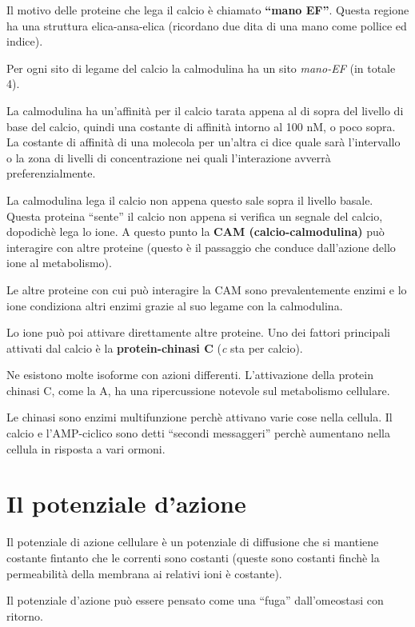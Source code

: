 \documentclass[]{article}
\begin{document}
Il motivo delle proteine che lega il calcio è chiamato \textbf{``mano
EF''}. Questa regione ha una struttura elica-ansa-elica (ricordano due
dita di una mano come pollice ed indice).

Per ogni sito di legame del calcio la calmodulina ha un sito
\emph{mano-EF} (in totale 4).

La calmodulina ha un'affinità per il calcio tarata appena al di sopra
del livello di base del calcio, quindi una costante di affinità intorno
al 100 nM, o poco sopra. La costante di affinità di una molecola per
un'altra ci dice quale sarà l'intervallo o la zona di livelli di
concentrazione nei quali l'interazione avverrà preferenzialmente.

La calmodulina lega il calcio non appena questo sale sopra il livello
basale. Questa proteina ``sente'' il calcio non appena si verifica un
segnale del calcio, dopodichè lega lo ione. A questo punto la
\textbf{CAM (calcio-calmodulina)} può interagire con altre proteine
(questo è il passaggio che conduce dall'azione dello ione al
metabolismo).

Le altre proteine con cui può interagire la CAM sono prevalentemente
enzimi e lo ione condiziona altri enzimi grazie al suo legame con la
calmodulina.

Lo ione può poi attivare direttamente altre proteine. Uno dei fattori
principali attivati dal calcio è la \textbf{protein-chinasi C} (\emph{c}
sta per calcio).

Ne esistono molte isoforme con azioni differenti. L'attivazione della
protein chinasi C, come la A, ha una ripercussione notevole sul
metabolismo cellulare.

Le chinasi sono enzimi multifunzione perchè attivano varie cose nella
cellula. Il calcio e l'AMP-ciclico sono detti ``secondi messaggeri''
perchè aumentano nella cellula in risposta a vari ormoni.

\section{Il potenziale d'azione}\label{il-potenziale-dazione}

Il potenziale di azione cellulare è un potenziale di diffusione che si
mantiene costante fintanto che le correnti sono costanti (queste sono
costanti finchè la permeabilità della membrana ai relativi ioni è
costante).

Il potenziale d'azione può essere pensato come una ``fuga''
dall'omeostasi con ritorno.
\end{document}
